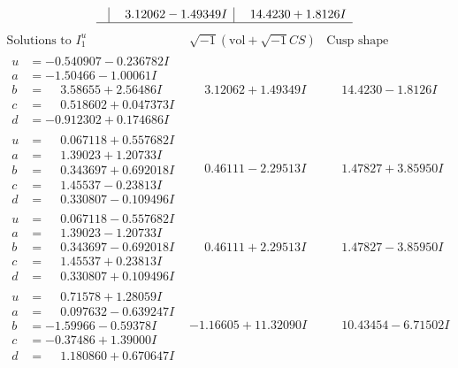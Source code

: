\documentclass[1p]{elsarticle_modified}
\theoremstyle{definition}
\newcommand{\I}{\sqrt{-1}}
\begin{document}
$$\begin{array}{c|c|c}
 & \phantom{-}3.12062 - 1.49349 I & \phantom{-}14.4230 + 1.8126 I\\
 \hline 
 \end{array}$$\newpage$$\begin{array}{c|c|c}  
\text{Solutions to }I^u_{1}& \I (\text{vol} + \sqrt{-1}CS) & \text{Cusp shape}\\
 \hline 
\begin{aligned}
u &= -0.540907 - 0.236782 I \\
a &= -1.50466 - 1.00061 I \\
b &= \phantom{-}3.58655 + 2.56486 I \\
c &= \phantom{-}0.518602 + 0.047373 I \\
d &= -0.912302 + 0.174686 I\end{aligned}
 & \phantom{-}3.12062 + 1.49349 I & \phantom{-}14.4230 - 1.8126 I \\ \hline\begin{aligned}
u &= \phantom{-}0.067118 + 0.557682 I \\
a &= \phantom{-}1.39023 + 1.20733 I \\
b &= \phantom{-}0.343697 + 0.692018 I \\
c &= \phantom{-}1.45537 - 0.23813 I \\
d &= \phantom{-}0.330807 - 0.109496 I\end{aligned}
 & \phantom{-}0.46111 - 2.29513 I & \phantom{-}1.47827 + 3.85950 I \\ \hline\begin{aligned}
u &= \phantom{-}0.067118 - 0.557682 I \\
a &= \phantom{-}1.39023 - 1.20733 I \\
b &= \phantom{-}0.343697 - 0.692018 I \\
c &= \phantom{-}1.45537 + 0.23813 I \\
d &= \phantom{-}0.330807 + 0.109496 I\end{aligned}
 & \phantom{-}0.46111 + 2.29513 I & \phantom{-}1.47827 - 3.85950 I \\ \hline\begin{aligned}
u &= \phantom{-}0.71578 + 1.28059 I \\
a &= \phantom{-}0.097632 - 0.639247 I \\
b &= -1.59966 - 0.59378 I \\
c &= -0.37486 + 1.39000 I \\
d &= \phantom{-}1.180860 + 0.670647 I\end{aligned}
 & -1.16605 + 11.32090 I & \phantom{-}10.43454 - 6.71502 I \\ \hline\begin{aligned}

\end{aligned}
\end{array}$$
\end{document}
